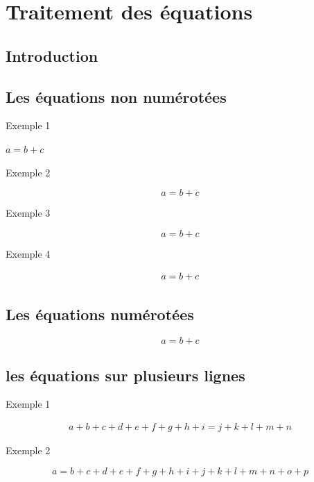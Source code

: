 \chapter{Traitement des équations}

\section{Introduction}


\section{Les équations non numérotées}

Exemple 1

$
a = b + c
$
\vspace{1cm}

Exemple 2

$$
a = b + c
$$
\vspace{1cm}


Exemple 3

\[
a = b + c
\]


\vspace{1cm}

Exemple 4

\begin{equation*}
\centering
a = b + c
\end{equation*}




\section{Les équations numérotées}

\begin{equation}
a = b + c
\end{equation}


\section{les équations sur plusieurs lignes}

Exemple 1

\begin{multline}
a + b + c + d + e + f
+ g + h + i
= j + k + l + m + n
\end{multline}

\vspace{1cm}

Exemple 2

\begin{equation}
a = b + c + d + e + f
+ g + h + i + j
+ k + l + m + n + o + p
\label{eq:equation_too_long}
\end{equation}

